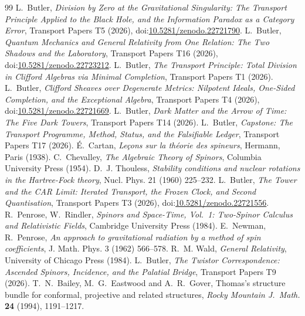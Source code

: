 \documentclass[11pt]{article}
\theoremstyle{definition}
\theoremstyle{plain}
\begin{document}
\begin{thebibliography}{99}
 L.~Butler,
\emph{Division by Zero at the Gravitational Singularity: The Transport Principle Applied to the Black Hole, and the Information Paradox as a Category Error},
Transport Papers T5 (2026), doi:\href{https://doi.org/10.5281/zenodo.22721790}{10.5281/zenodo.22721790}.
 L.~Butler,
\emph{Quantum Mechanics and General Relativity from One Relation: The Two Shadows and the Laboratory},
Transport Papers T16 (2026), doi:\href{https://doi.org/10.5281/zenodo.22723212}{10.5281/zenodo.22723212}.
 L.~Butler,
\emph{The Transport Principle: Total Division in Clifford Algebras via Minimal Completion},
Transport Papers T1 (2026).
 L.~Butler,
\emph{Clifford Sheaves over Degenerate Metrics: Nilpotent Ideals, One-Sided Completion, and the Exceptional Algebra},
Transport Papers T4 (2026), doi:\href{https://doi.org/10.5281/zenodo.22721669}{10.5281/zenodo.22721669}.
 L.~Butler,
\emph{Dark Matter and the Arrow of Time: The Five Dark Towers},
Transport Papers T14 (2026).
 L.~Butler,
\emph{Capstone: The Transport Programme, Method, Status, and the Falsifiable Ledger},
Transport Papers T17 (2026).
 \'E.~Cartan,
\emph{Le\c{c}ons sur la th\'eorie des spineurs},
Hermann, Paris (1938).
 C.~Chevalley,
\emph{The Algebraic Theory of Spinors},
Columbia University Press (1954).
 D.~J. Thouless,
\emph{Stability conditions and nuclear rotations in the Hartree-Fock theory},
Nucl. Phys. 21 (1960) 225--232.
 L.~Butler,
\emph{The Tower and the CAR Limit: Iterated Transport, the Frozen Clock, and Second Quantisation},
Transport Papers T3 (2026), doi:\href{https://doi.org/10.5281/zenodo.22721556}{10.5281/zenodo.22721556}.
 R.~Penrose, W.~Rindler,
\emph{Spinors and Space-Time, Vol.~1: Two-Spinor Calculus and Relativistic Fields},
Cambridge University Press (1984).
 E.~Newman, R.~Penrose,
\emph{An approach to gravitational radiation by a method of spin coefficients},
J. Math. Phys. 3 (1962) 566--578.
 R.~M. Wald,
\emph{General Relativity},
University of Chicago Press (1984).
 L.~Butler,
\emph{The Twistor Correspondence: Ascended Spinors, Incidence, and the Palatial Bridge},
Transport Papers T9 (2026).
 T.~N.~Bailey, M.~G.~Eastwood and A.~R.~Gover,
Thomas's structure bundle for conformal, projective and related structures,
\emph{Rocky Mountain J.\ Math.} \textbf{24} (1994), 1191--1217.

\end{thebibliography}
\end{document}
